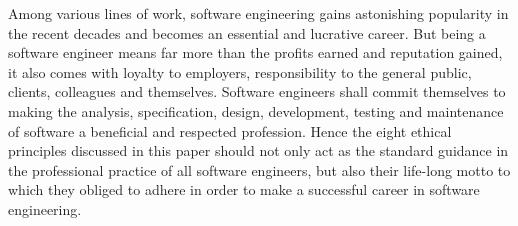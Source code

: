 Among various lines of work, software engineering gains astonishing popularity in the recent decades and becomes an essential and lucrative career. But being a software engineer means far more than the profits earned and reputation gained, it also comes with loyalty to employers, responsibility to the general public, clients, colleagues and themselves. Software engineers shall commit themselves to making the analysis, specification, design, development, testing and maintenance of software a beneficial and respected profession\cite{Gotterbarn:1999:PST:308769.308770}. Hence the eight ethical principles discussed in this paper should not only act as the standard guidance in the professional practice of all software engineers, but also their life-long motto to which they obliged to adhere in order to make a successful career in software engineering.
  